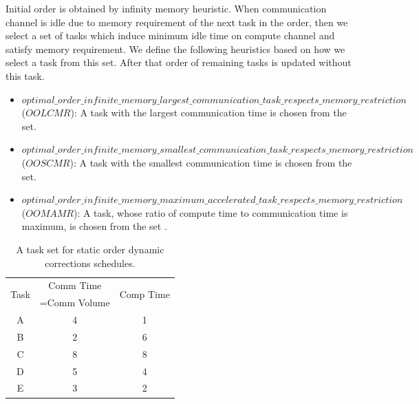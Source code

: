 \documentclass[sigconf]{acmart}
\begin{document}
	Initial order is obtained by infinity memory heuristic. When communication channel is idle due to memory requirement of the next task in the order, then we select a set of tasks which induce minimum idle time on compute channel and satisfy memory requirement. We define the following heuristics based on how we select a task from this set. After that order of remaining  tasks is updated without this task.
	
	\begin{itemize}[a)]
		\item $optimal\_order\_infinite\_memory\_largest\_communication\_task\_respects\_memory\_restriction$ ($OOLCMR$): A task with the largest communication time is chosen from the set.
		\item $optimal\_order\_infinite\_memory\_smallest\_communication\_task\_respects\_memory\_restriction$ ($OOSCMR$):  A task with the smallest communication time is chosen from the set.
		\item $optimal\_order\_infinite\_memory\_maximum\_accelerated\_task\_respects\_memory\_restriction$ ($OOMAMR$): A task,  whose ratio of compute time to communication time is maximum, is chosen from the set .
	\end{itemize}
	
	\begin{table}[htb]
		\begin{center}
			
			\begin{tabular}{|c|c|c|}
				\hline
				\multirow{2}{*}{Task} & Comm Time & \multirow{2}{*}{Comp Time}\\ 
				&=Comm Volume& \\ \hline
				A & 4 & 1\\ \hline
				B & 2 & 6\\ \hline
				C & 8 & 8\\ \hline
				D & 5 & 4\\ \hline
				E & 3 & 2\\ \hline
			\end{tabular}
			\caption{\label{tab:staticOrderDynamicCorrectionsExample} A task set for static order dynamic corrections schedules.}
		\end{center}
	\end{table}
	
\end{document}
